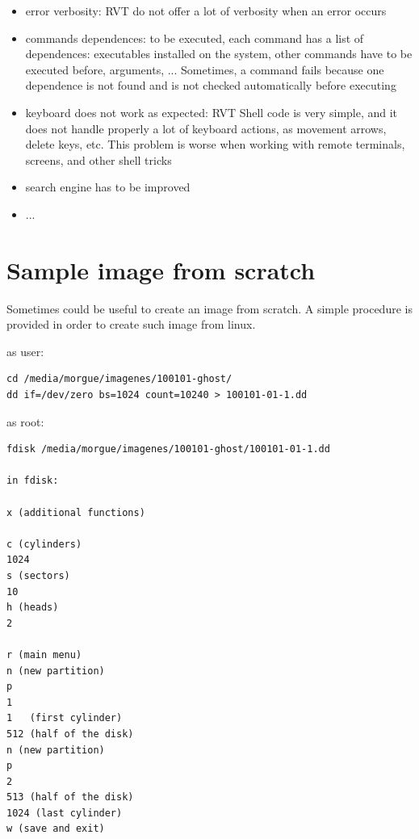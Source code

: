 \documentclass[a4paper,11pt,oneside]{report}
\begin{document}
\begin{itemize}

\item error verbosity:  RVT do not offer a lot of verbosity when an error occurs

\item commands dependences:  to be executed, each command has a list of dependences: executables installed on the system, other commands have to be executed before, arguments, ...  Sometimes, a command fails because one dependence is not found and is not checked automatically before executing

\item keyboard does not work as expected:  RVT Shell code is very simple, and it does not handle properly a lot of keyboard actions, as movement arrows, delete keys, etc. This problem is worse when working with remote terminals, screens, and other shell tricks

\item search engine has to be improved

\item ... 

\end{itemize}




\appendix




\chapter{Sample image from scratch} \label{anx:scratch}

Sometimes could be useful to create an image from scratch. A simple procedure is provided in order to create such image from linux.

as user:

\begin{verbatim}
cd /media/morgue/imagenes/100101-ghost/
dd if=/dev/zero bs=1024 count=10240 > 100101-01-1.dd
\end{verbatim}

as root:

\begin{verbatim}
fdisk /media/morgue/imagenes/100101-ghost/100101-01-1.dd

in fdisk:

x (additional functions)

c (cylinders)
1024
s (sectors)
10
h (heads)
2

r (main menu)
n (new partition)
p 
1
1   (first cylinder)
512 (half of the disk)
n (new partition)
p 
2
513 (half of the disk)
1024 (last cylinder)
w (save and exit)
\end{verbatim}
\end{document}
